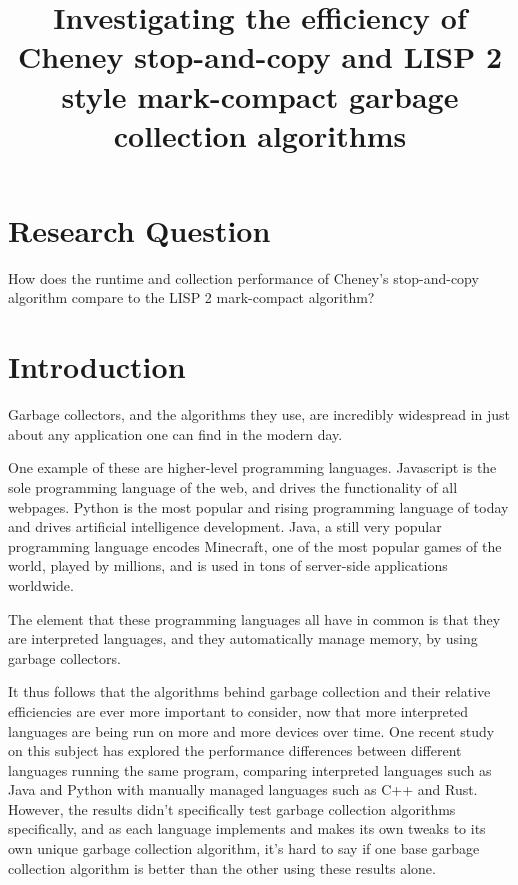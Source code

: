 \documentclass[index]{subfiles}
\begin{document}
\title{Investigating the efficiency of Cheney stop-and-copy and LISP 2 style mark-compact garbage collection algorithms}
\date{}
\author{}
\maketitle

\section{Research Question}

How does the runtime and collection performance of Cheney's stop-and-copy algorithm compare to the LISP 2 mark-compact algorithm?

\section{Introduction}

Garbage collectors, and the algorithms they use, are incredibly widespread in just about any application one can find in the modern day.

One example of these are higher-level programming languages. Javascript is the sole programming language of the web, and drives the functionality of all webpages. Python is the most popular and rising programming language of today and drives artificial intelligence development. Java, a still very popular programming language encodes Minecraft, one of the most popular games of the world, played by millions, and is used in tons of server-side applications worldwide.

The element that these programming languages all have in common is that they are interpreted languages, and they automatically manage memory, by using garbage collectors.

It thus follows that the algorithms behind garbage collection and their relative efficiencies are ever more important to consider, now that more interpreted languages are being run on more and more devices over time. One recent study on this subject has explored the performance differences between different languages running the same program\cite{programming_languages_electricity}, comparing interpreted languages such as Java and Python with manually managed languages such as C++ and Rust. However, the results didn't specifically test garbage collection algorithms specifically, and as each language implements and makes its own tweaks to its own unique garbage collection algorithm, it's hard to say if one base garbage collection algorithm is better than the other using these results alone.
\end{document}
